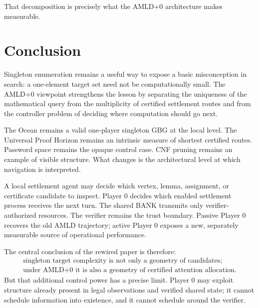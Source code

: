 \documentclass[11pt]{article}
\begin{document}
That decomposition is precisely what the AMLD+0 architecture makes measurable.

\section{Conclusion}

Singleton enumeration remains a useful way to expose a basic misconception in
search: a one-element target set need not be computationally small.  The
AMLD+0 viewpoint strengthens the lesson by separating the uniqueness of the
mathematical query from the multiplicity of certified settlement routes and
from the controller problem of deciding where computation should go next.

The Ocean remains a valid one-player singleton GBG at the local level.  The
Universal Proof Horizon remains an intrinsic measure of shortest certified
routes.  Password space remains the opaque control case.  CNF pruning remains
an example of visible structure.  What changes is the architectural level at
which navigation is interpreted.

A local settlement agent may decide which vertex, lemma, assignment, or
certificate candidate to inspect.  Player 0 decides which enabled settlement
process receives the next turn.  The shared BANK transmits only
verifier-authorized resources.  The verifier remains the trust boundary.
Passive Player 0 recovers the old AMLD trajectory; active Player 0 exposes a
new, separately measurable source of operational performance.

The central conclusion of the rewired paper is therefore:
\[
\boxed{
\begin{array}{c}
\text{singleton target complexity is not only a geometry of candidates;}\\
\text{under AMLD+0 it is also a geometry of certified attention allocation.}
\end{array}}
\]
But that additional control power has a precise limit.  Player 0 may exploit
structure already present in legal observations and verified shared state; it
cannot schedule information into existence, and it cannot schedule around the
verifier.
\end{document}

